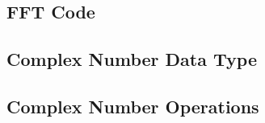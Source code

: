 \documentclass[10pt]{article}           %
\begin{document}


\subsection{FFT Code}
\label{sub:fft_code}



\subsection{Complex Number Data Type}
\label{sub:complex_number_data_type}



\subsection{Complex Number Operations}
\label{sub:complex_number_operations}


\end{document}
